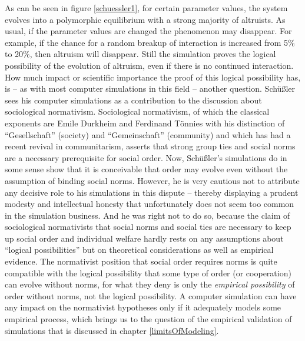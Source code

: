 As can be seen in figure \ref{schuessler1}, for certain parameter values, the
system evolves into a polymorphic equilibrium with a strong majority of
altruists. As usual, if the parameter values are changed the phenomenon may
disappear. For example, if the chance for a random breakup of interaction is
increased from 5\% to 20\%, then altruism will disappear. Still the simulation
proves the logical possibility of the evolution of altruism, even if there is
no continued interaction. How much impact or scientific importance the proof
of this logical possibility has, is -- as with most computer simulations in
this field -- another question. Schüßler sees his computer simulations as a
contribution to the discussion about sociological normativism. Sociological
normativism, of which the classical exponents are Emile Durkheim and Ferdinand
Tönnies with his distinction of ``Gesellschaft'' (society) and
``Gemeinschaft'' (community) and which has had a recent revival in
communitarism, asserts that strong group ties and social norms are a necessary
prerequisite for social order. Now, Schüßler's simulations do in some sense
show that it is conceivable that order may evolve even without the assumption
of binding social norms. However, he is very cautious not to attribute any
decisive role to his simulations in this dispute \cite[p.
91f.]{schuessler:1997} -- thereby displaying a prudent modesty and
intellectual honesty that unfortunately does not seem too common in the
simulation business. And he was right not to do so, because the claim of
sociological normativists that social norms and social ties are necessary to
keep up social order and individual welfare hardly rests on any assumptions
about ``logical possibilities'' but on theoretical considerations as well as
empirical evidence. The normativist position that social order requires norms
is quite compatible with the logical possibility that some type of order (or
cooperation) can evolve without norms, for what they deny is only the {\em
  empirical possibility} of order without norms, not the logical possibility.
A computer simulation can have any impact on the normativist hypotheses only
if it adequately models some empirical process, which brings us to the
question of the empirical validation of simulations that is discussed in
chapter \ref{limitsOfModeling}.

